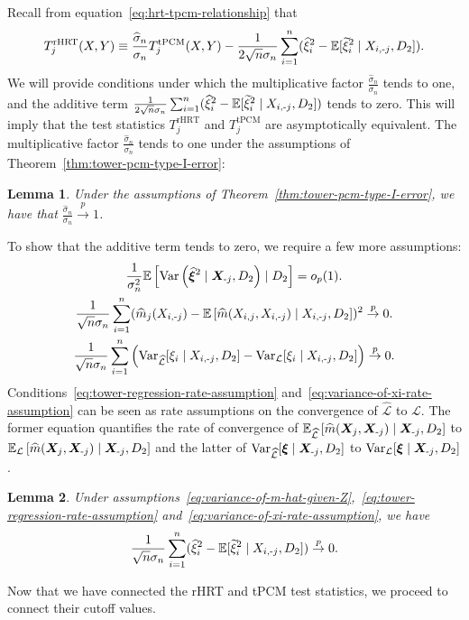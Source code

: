 \documentclass[12pt]{article}
\newtheorem{lemma}{Lemma}
\theoremstyle{definition}
\theoremstyle{remark}
\newcommand{\E}{\mathbb E}								%
\newcommand{\V}{\mathrm{Var}}							%
\newcommand{\convp}{\overset p \rightarrow}             %
\newcommand{\prx}{\bm X}								%
\newcommand{\srx}{X}									%
\newcommand{\sry}{Y}									%
\newcommand{\pxi}{\bm \xi}						%
\newcommand{\sxi}{\xi}							%
\newcommand{\law}{\mathcal L}							%
\newcommand{\lawhat}{\widehat{\mathcal L}}				%
\newcommand{\minus}{\textnormal{-}} 						    %
\begin{document}
Recall from equation~\eqref{eq:hrt-tpcm-relationship} that
\begin{equation}
T_j^{\text{rHRT}}(\srx, \sry) \equiv \frac{\widehat \sigma_n}{ \sigma_n} T^{\textnormal{tPCM}}_j (\srx,\sry)  - \frac{1}{2\sqrt n \sigma_n}\sum_{i=1}^n(\widehat \xi_i^2 - \E[\widetilde \xi_i^2 \mid \srx_{i,\minus j},  D_2]).
\end{equation}
We will provide conditions under which the multiplicative factor $\frac{\widehat \sigma_n}{\sigma_n}$ tends to one, and the additive term $\frac{1}{2\sqrt n \sigma_n}\sum_{i=1}^n(\widehat \xi_i^2 - \E[\widetilde \xi_i^2 \mid \srx_{i,\minus j},  D_2])$ tends to zero. This will imply that the test statistics $T_j^{\text{rHRT}}$ and $T_j^{\text{tPCM}}$ are asymptotically equivalent. The multiplicative factor $\frac{\widehat \sigma_n}{\sigma_n}$ tends to one under the assumptions of Theorem~\ref{thm:tower-pcm-type-I-error}:
\begin{lemma} \label{lem:sigma-hat-n-convergence}
Under the assumptions of Theorem~\ref{thm:tower-pcm-type-I-error}, we have that $\frac{\widehat \sigma_n}{\sigma_n} \convp 1$.
\end{lemma}
\noindent To show that the additive term tends to zero, we require a few more assumptions:
\begin{gather}
	\label{eq:variance-of-m-hat-given-Z}
	\frac{1}{\sigma_n^2} \E\left[ \V\left(\bm{\widehat \xi}^2 \mid \prx_{\minus j}, D_2\right)\mid D_2\right] = o_p(1).\\
	\label{eq:tower-regression-rate-assumption}
	\frac{1}{\sqrt n\sigma_n}\sum_{i=1}^n (\widehat m_j(\srx_{i,\minus j}) - \E\left[\widehat m(\srx_{i,j},\srx_{i,\minus j}) \mid \srx_{i,\minus j}, D_2\right])^2 \overset{p}{\to} 0.\\
	\label{eq:variance-of-xi-rate-assumption}
	\frac{1}{\sqrt n \sigma_n} \sum_{i=1}^n\left(\V_{\lawhat}[\sxi_i \mid \srx_{i,\minus j}, D_2] - \V_{\law}[\sxi_i \mid \srx_{i,\minus j}, D_2]\right)\overset{p}{\to} 0.
\end{gather}
Conditions~\eqref{eq:tower-regression-rate-assumption} and~\eqref{eq:variance-of-xi-rate-assumption} can be seen as rate assumptions on the convergence of $\lawhat$ to $\law$. The former equation quantifies the rate of convergence of $\E_{\lawhat}\left[\widehat m(\prx_j,\prx_{\minus j}) \mid \prx_{\minus j}, D_2\right]$ to $\E_{\law}\left[\widehat m(\prx_j,\prx_{\minus j}) \mid \prx_{\minus j}, D_2\right]$ and the latter of $\V_{\lawhat}[\pxi \mid \prx_{\minus j}, D_2]$ to   $\V_{\law}[\pxi\mid \prx_{\minus j}, D_2]$.
\begin{lemma}\label{lemma:extra-term-in-HRT-vanishes}
Under assumptions~\eqref{eq:variance-of-m-hat-given-Z},~\eqref{eq:tower-regression-rate-assumption} and~\eqref{eq:variance-of-xi-rate-assumption}, we have
\begin{equation}\label{eq:def-E_n}
\frac{1}{\sqrt n \sigma_n}\sum_{i=1}^n(\widehat \xi_i^2 - \E[\widetilde \xi_i^2 \mid \srx_{i,\minus j},  D_2]) \convp 0.
\end{equation}
\end{lemma}
Now that we have connected the rHRT and tPCM test statistics, we proceed to connect their cutoff values.
\end{document}
